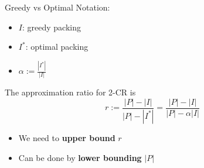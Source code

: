 \begin{frame}{Greedy vs Optimal}
Notation:
\begin{itemize}
\boldmath	
\pause\item
$I$: greedy packing

\pause\item
$I^*$: optimal packing

\pause\item
$\alpha := \frac{|I^*|}{|I|}$ 

\end{itemize}

\pause
\begin{observation}
The approximation ratio for 2-CR is
$$ r := \frac{|P| - |I|}{|P| - |I^*|} = \frac{|P| - |I|}{|P| - \alpha|I|}$$
\end{observation}

\begin{itemize}
\pause\item
We need to \textbf{upper bound} $r$
\pause\item
Can be done by \textbf{lower bounding} $|P|$
\end{itemize}


\end{frame}